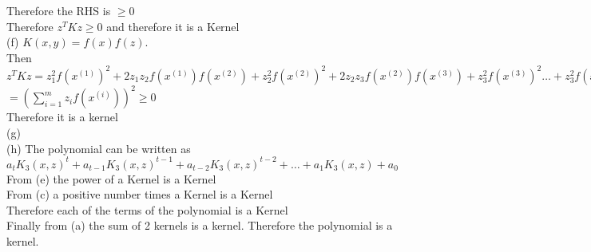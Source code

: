 \begin{answer}
Therefore the RHS is $\geq 0$\\
Therefore $z^TKz \geq 0$ and therefore it is a Kernel\\ 
(f) $K(x,y)=f(x)f(z)$.\\
Then $z^TKz=z_1^2f(x^{(1)})^2+2z_1z_2f(x^{(1)})f(x^{(2)})+z_2^2f(x^{(2)})^2+2z_2z_3f(x^{(2)})f(x^{(3)})+z_3^2f(x^{(3)})^2 \dots +z_3^2f(x^{(3)})^2$\\
$=(\sum_{i=1}^{m}z_i f(x^{(i)}))^2 \geq 0$\\
Therefore it is a kernel\\
(g) \\
(h) The polynomial can be written as $a_tK_3(x,z)^t+a_{t-1}K_3(x,z)^{t-1}+a_{t-2}K_3(x,z)^{t-2}+\dots+a_1K_3(x,z)+a_0$\\
From (e) the power of a Kernel is a Kernel\\
From (c) a positive number times a Kernel is a Kernel\\
Therefore each of the terms of the polynomial is a Kernel\\
Finally from (a) the sum of 2 kernels is a kernel. Therefore the polynomial is a kernel.
\end{answer}